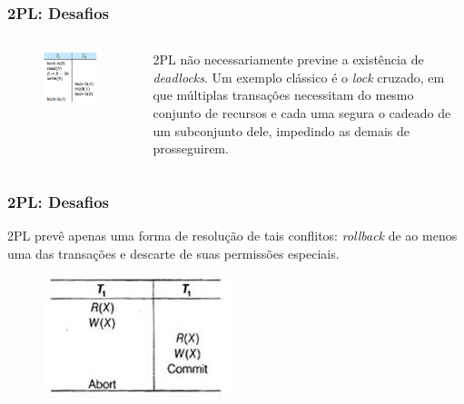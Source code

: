 \documentclass{beamer}
\begin{document}
\begin{frame} %
    \frametitle{2PL: Desafios}

    \begin{columns}[c] %
    
            \begin{figure}
                \includegraphics[width=0.8\linewidth]{example6.png}
            \end{figure}
        
        
        2PL não necessariamente previne a existência de \emph{deadlocks}. Um exemplo clássico é o \emph{lock} cruzado, em que múltiplas transações necessitam do mesmo conjunto de recursos e cada uma segura o cadeado de um subconjunto dele, impedindo as demais de prosseguirem.
    \end{columns}
    
\end{frame}


\begin{frame} %
    \frametitle{2PL: Desafios}

    \medskip
    2PL prevê apenas uma forma de resolução de tais conflitos: \emph{rollback} de ao menos uma das transações e descarte de suas permissões especiais.

    \medskip
    \medskip
    \begin{figure}
        \includegraphics[width=0.4\linewidth]{example7.jpg}
    \end{figure}
\end{frame}
\end{document}
